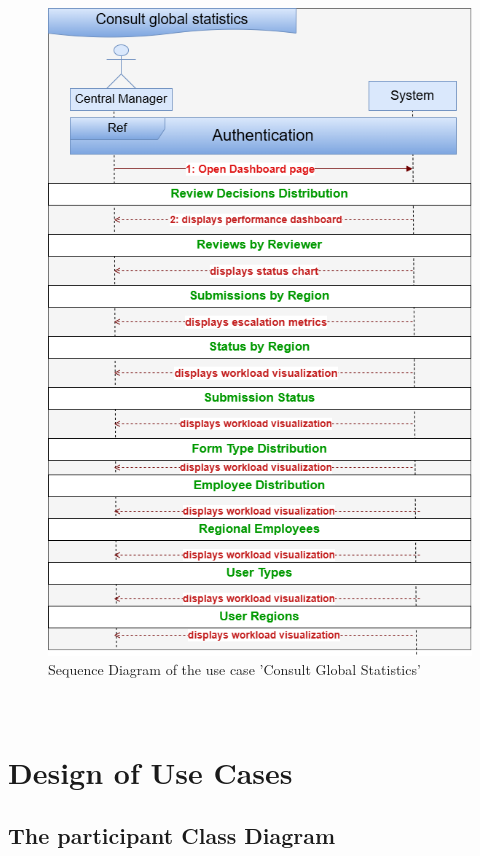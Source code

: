 \begin{figure}[h!]
    \centering
    \includegraphics[width=1\textwidth]{figures/seq consult global statistics.png}
    \caption{Sequence Diagram of the use case 'Consult Global Statistics'}
\end{figure}\


\clearpage
\section{Design of Use Cases}
\subsection{The participant Class Diagram}
